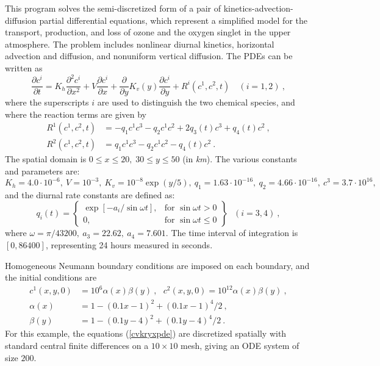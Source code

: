This program solves the semi-discretized form of a pair of
kinetics-advection-diffusion partial differential equations, which
represent a simplified model for the transport, production, and loss
of ozone and the oxygen singlet in the upper atmosphere.  The problem
includes nonlinear diurnal kinetics, horizontal advection and diffusion, 
and nonuniform vertical diffusion.  The PDEs can be written as
\begin{equation}\label{cvkryxpde}
  \frac{\partial c^i}{\partial t}=K_h\frac{\partial^2 c^i}{\partial x^2}
  +V \frac{\partial c^i}{\partial x}
  + \frac{\partial} {\partial y} K_v(y) \frac{\partial c^i}{\partial y}
  + R^i(c^1,c^2,t) \quad (i=1,2)~,
\end{equation}
where the superscripts $i$ are used to distinguish the two chemical
species, and where the reaction terms are given by
\begin{equation}\label{e:cvkryx:r}
\begin{split}
  R^1(c^1,c^2,t) & = -q_1c^1c^3-q_2c^1c^2+2q_3(t)c^3+q_4(t)c^2 ~, \\
  R^2(c^1,c^2,t) & = q_1c^1c^3-q_2c^1c^2-q_4(t)c^2 ~.
\end{split}
\end{equation}
The spatial domain is $0 \leq x \leq 20,\;30 \leq y \leq 50$ (in {\it km}). 
The various constants and parameters are: $K_h=4.0\cdot 10^{-6},
~ V=10^{-3},~ K_v=10^{-8}\exp (y/5),~ q_1=1.63\cdot 10^{-16},
~ q_2=4.66\cdot 10^{-16},~ c^3=3.7\cdot 10^{16},$ and the diurnal
rate constants are defined as:
\begin{equation*}
q_i(t) = 
\left\{ \begin{array}{ll}
  \exp [-a_i/\sin \omega t], & \mbox{for } \sin \omega t>0 \\
  0, & \mbox{for } \sin \omega t\leq 0
  \end{array} \right\} ~~~(i=3,4) ~,
\end{equation*}
where $\omega =\pi /43200, ~ a_3=22.62,~ a_4=7.601.$  The time interval of
integration is $[0, 86400]$, representing 24 hours measured in seconds.

Homogeneous Neumann boundary conditions are imposed on each boundary, and the
initial conditions are 
\begin{equation} \label{cvkryxic}
  \begin{split}
  c^{1}(x,y,0) &= 10^{6}\alpha (x)\beta (y) ~,~~~ 
                    c^{2}(x,y,0)=10^{12}\alpha(x)\beta (y) ~, \\
  \alpha (x) &= 1-(0.1x-1)^{2}+(0.1x-1)^{4}/2 ~, \\
  \beta (y) &= 1-(0.1y-4)^{2}+(0.1y-4)^{4}/2 ~.
  \end{split} 
\end{equation}
For this example, the equations (\ref{cvkryxpde}) are discretized spatially
with standard central finite differences on a $10 \times 10$ mesh,
giving an ODE system of size $200$.

